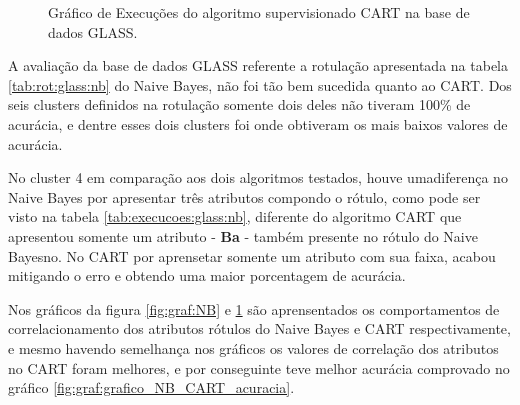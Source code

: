 \begin{figure}[!h]
{        \label{fig:graf:GLASS_CART_3} }
    \hspace{0.5cm}
    
    \caption{Gráfico de Execuções do algoritmo supervisionado CART na base de dados GLASS.} \label{fig:graf:CART}
        
\end{figure}

A avaliação da base de dados GLASS referente a rotulação apresentada na tabela \ref{tab:rot:glass:nb} do Naive Bayes, não foi tão bem sucedida quanto ao CART. Dos seis clusters definidos na rotulação somente dois deles não tiveram 100\% de acurácia, e dentre esses dois clusters foi onde obtiveram os mais baixos valores de acurácia.

No cluster 4 em comparação aos dois algoritmos testados, houve umadiferença no Naive Bayes por apresentar três atributos compondo o rótulo, como pode ser visto na tabela \ref{tab:execucoes:glass:nb}, diferente do algoritmo CART que apresentou somente um atributo - \textbf{Ba} - também presente no rótulo do Naive Bayesno. No CART por aprensetar somente um atributo com sua faixa, acabou mitigando o erro e obtendo uma maior porcentagem de acurácia.

Nos gráficos da figura  \ref{fig:graf:NB} e \ref{fig:graf:CART} são aprensentados os comportamentos de correlacionamento dos atributos rótulos do Naive Bayes e CART respectivamente, e mesmo havendo semelhança nos gráficos os valores de correlação dos atributos no CART foram melhores, e por conseguinte teve melhor acurácia comprovado no gráfico \ref{fig:graf:grafico_NB_CART_acuracia}.

